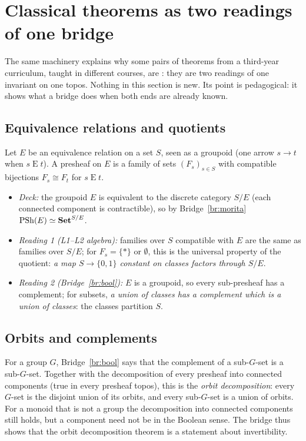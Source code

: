 \section{Classical theorems as two readings of one bridge}\label{sec:equivalences}

The same machinery explains why some pairs of theorems from a third-year curriculum, taught in different courses, are : they are two readings of one invariant on one topos. Nothing in this section is new. Its point is pedagogical: it shows what a bridge does when both ends are already known.

\subsection{Equivalence relations and quotients}

Let $E$ be an equivalence relation on a set $S$, seen as a groupoid (one arrow $s\to t$ when $s\mathrel E t$). A presheaf on $E$ is a family of sets $(F_s)_{s\in S}$ with compatible bijections $F_s\cong F_t$ for $s\mathrel E t$.

\begin{itemize}
\item \emph{Deck:} the groupoid $E$ is equivalent to the discrete category $S/E$ (each connected component is contractible), so by Bridge~\ref{br:morita} $\mathrm{PSh}(E)\simeq\mathbf{Set}^{S/E}$.
\item \emph{Reading 1 (L1--L2 algebra):} families over $S$ compatible with $E$ are the same as families over $S/E$; for $F_s = \{\ast\}$ or $\emptyset$, this is the universal property of the quotient: \emph{a map $S\to\{0,1\}$ constant on classes factors through $S/E$}.
\item \emph{Reading 2 (Bridge~\ref{br:bool}):} $E$ is a groupoid, so every sub-presheaf has a complement; for subsets, \emph{a union of classes has a complement which is a union of classes}: the classes partition $S$.
\end{itemize}

\subsection{Orbits and complements}

For a group $G$, Bridge~\ref{br:bool} says that the complement of a sub-$G$-set is a sub-$G$-set. Together with the decomposition of every presheaf into connected components (true in every presheaf topos), this is the \emph{orbit decomposition}: every $G$-set is the disjoint union of its orbits, and every sub-$G$-set is a union of orbits. For a monoid that is not a group the decomposition into connected components still holds, but a component need not be  in the Boolean sense. The bridge thus shows that the orbit decomposition theorem is a statement about invertibility.

